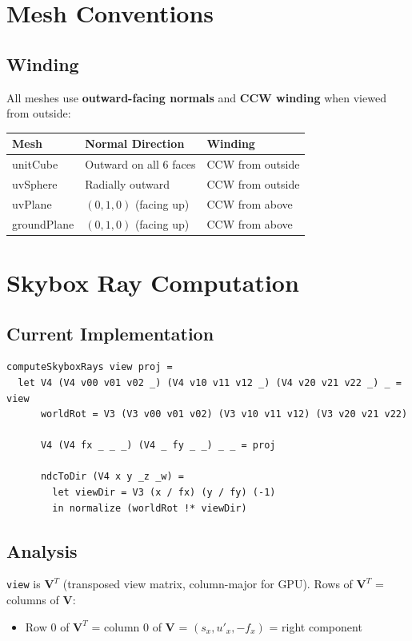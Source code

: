 \documentclass{article}
\begin{document}
\section{Mesh Conventions}

\subsection{Winding}
All meshes use \textbf{outward-facing normals} and \textbf{CCW winding} when viewed from outside:

\begin{tabular}{lll}
\toprule
Mesh & Normal Direction & Winding \\
\midrule
unitCube & Outward on all 6 faces & CCW from outside \\
uvSphere & Radially outward & CCW from outside \\
uvPlane & $(0, 1, 0)$ (facing up) & CCW from above \\
groundPlane & $(0, 1, 0)$ (facing up) & CCW from above \\
\bottomrule
\end{tabular}

\section{Skybox Ray Computation}

\subsection{Current Implementation}
\begin{verbatim}
computeSkyboxRays view proj =
  let V4 (V4 v00 v01 v02 _) (V4 v10 v11 v12 _) (V4 v20 v21 v22 _) _ = view
      worldRot = V3 (V3 v00 v01 v02) (V3 v10 v11 v12) (V3 v20 v21 v22)
      
      V4 (V4 fx _ _ _) (V4 _ fy _ _) _ _ = proj
      
      ndcToDir (V4 x y _z _w) =
        let viewDir = V3 (x / fx) (y / fy) (-1)
        in normalize (worldRot !* viewDir)
\end{verbatim}

\subsection{Analysis}
\texttt{view} is $\mathbf{V}^T$ (transposed view matrix, column-major for GPU). Rows of $\mathbf{V}^T$ = columns of $\mathbf{V}$:
\begin{itemize}
\item Row 0 of $\mathbf{V}^T$ = column 0 of $\mathbf{V}$ = $(s_x, u'_x, -f_x)$ = right component
\end{itemize}
\end{document}
